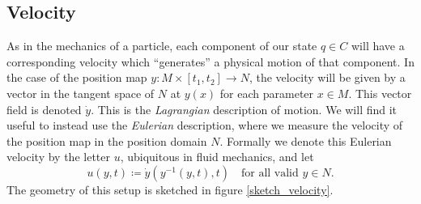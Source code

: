 \subsection{Velocity}
As in the mechanics of a particle, each component of our state $q \in C$ will have a corresponding velocity which ``generates'' a physical motion of that component.
In the case of the position map $y : M \times [t_1, t_2] \rightarrow N$, the velocity will be given by
a vector in the tangent space of $N$ at $y(x)$ for each parameter $x \in M$. This vector field is denoted $\dot{y}$.
This is the \textit{Lagrangian} description of motion. We will find it useful to instead use the \textit{Eulerian} description, where we measure the velocity of the position map in the position domain $N$. Formally we denote this Eulerian velocity by the letter $u$, ubiquitous in fluid mechanics, and let
    $$u(y, t) \coloneqq \dot{y}(y^{-1}(y, t), t)\quad \text{for all valid $y\in N$.}$$
The geometry of this setup is sketched in figure \ref{sketch_velocity}.


